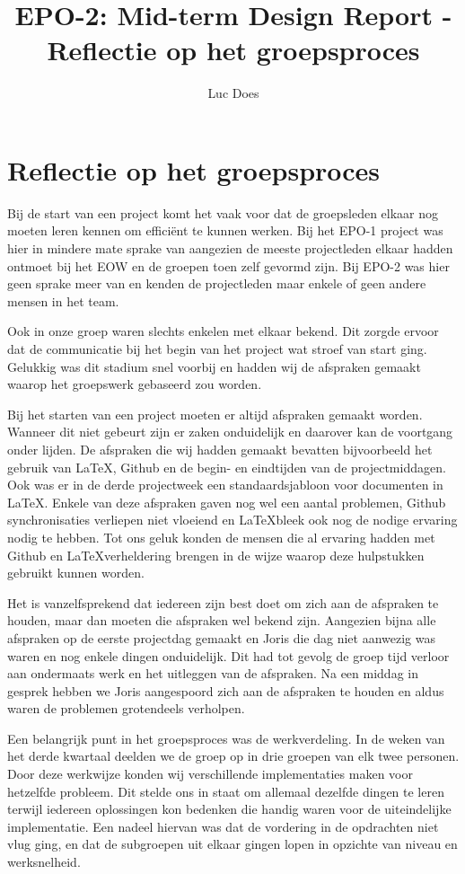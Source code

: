 \documentclass{report}
\title{EPO-2: Mid-term Design Report - Reflectie op het groepsproces}
\author{Luc Does}
\begin{document}
\chapter{Reflectie op het groepsproces}
Bij de start van een project komt het vaak voor dat de groepsleden elkaar nog moeten leren kennen om efficiënt te kunnen werken. Bij het EPO-1 project was hier in mindere mate sprake van aangezien de meeste projectleden elkaar hadden ontmoet bij het EOW en de groepen toen zelf gevormd zijn. Bij EPO-2 was hier geen sprake meer van en kenden de projectleden maar enkele of geen andere mensen in het team.
\newline

Ook in onze groep waren slechts enkelen met elkaar bekend. Dit zorgde ervoor dat de communicatie bij het begin van het project wat stroef van start ging. Gelukkig was dit stadium snel voorbij en hadden wij de afspraken gemaakt waarop het groepswerk gebaseerd zou worden.
\newline

Bij het starten van een project moeten er altijd afspraken gemaakt worden. Wanneer dit niet gebeurt zijn er zaken onduidelijk en daarover kan de voortgang onder lijden. De afspraken die wij hadden gemaakt bevatten bijvoorbeeld het gebruik van \LaTeX, Github en de begin- en eindtijden van de projectmiddagen. Ook was er in de derde projectweek een standaardsjabloon voor documenten in \LaTeX. Enkele van deze afspraken gaven nog wel een aantal problemen, Github synchronisaties verliepen niet vloeiend en \LaTeX  bleek ook nog de nodige ervaring nodig te hebben. Tot ons geluk  konden de mensen die al ervaring hadden met Github en \LaTeX  verheldering brengen in de wijze waarop deze hulpstukken gebruikt kunnen worden.
\newline

Het is  vanzelfsprekend dat iedereen zijn best doet om zich aan de afspraken te houden, maar dan moeten die afspraken wel bekend zijn. Aangezien bijna alle afspraken op de eerste projectdag gemaakt en Joris die dag niet aanwezig was waren en nog enkele dingen onduidelijk. Dit had tot gevolg de groep tijd verloor aan ondermaats werk en het uitleggen van de afspraken. Na een middag in gesprek hebben we Joris aangespoord zich aan de afspraken te houden en aldus waren de problemen grotendeels verholpen.
\newline

Een belangrijk punt in het groepsproces was de werkverdeling. In de weken van het derde kwartaal deelden we de groep op in drie groepen van elk twee personen. Door deze werkwijze konden wij verschillende implementaties maken voor hetzelfde probleem. Dit stelde ons in staat om allemaal dezelfde dingen te leren terwijl iedereen oplossingen kon bedenken die handig waren voor de uiteindelijke implementatie. Een nadeel hiervan was dat de vordering in de opdrachten niet vlug ging, en dat de subgroepen uit elkaar gingen lopen in opzichte van niveau en werksnelheid.
\newline
\end{document}
